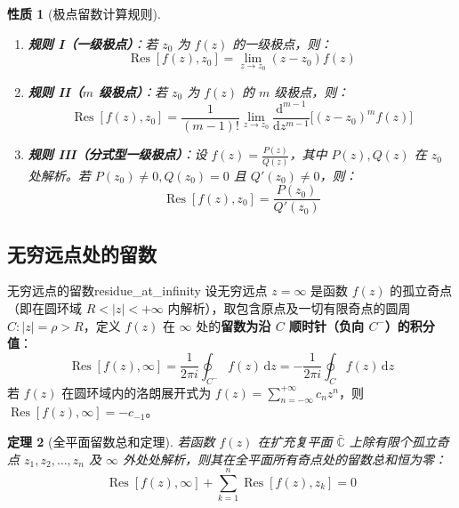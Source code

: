 \documentclass[11pt,a4paper,fontset=fandol]{ctexart}
\newtheorem{theorem}{定理}[section]
\newtheorem{property}[theorem]{性质}
\theoremstyle{remark}
\begin{document}
\begin{property}[极点留数计算规则]
\begin{enumerate}
    \item \textbf{规则 I（一级极点）}：若 $z_0$ 为 $f(z)$ 的一级极点，则：
    \begin{equation}
        \operatorname{Res}[f(z), z_0] = \lim_{z \to z_0} (z - z_0) f(z)
    \end{equation}
    \item \textbf{规则 II（$m$ 级极点）}：若 $z_0$ 为 $f(z)$ 的 $m$ 级极点，则：
    \begin{equation}
        \operatorname{Res}[f(z), z_0] = \frac{1}{(m - 1)!} \lim_{z \to z_0} \frac{\mathrm{d}^{m-1}}{\mathrm{d}z^{m-1}} \Big[ (z - z_0)^m f(z) \Big]
    \end{equation}
    \item \textbf{规则 III（分式型一级极点）}：设 $f(z) = \frac{P(z)}{Q(z)}$，其中 $P(z), Q(z)$ 在 $z_0$ 处解析。若 $P(z_0) \neq 0, Q(z_0) = 0$ 且 $Q'(z_0) \neq 0$，则：
    \begin{equation}
        \operatorname{Res}[f(z), z_0] = \frac{P(z_0)}{Q'(z_0)}
    \end{equation}
\end{enumerate}
\end{property}

\subsection{无穷远点处的留数}

\begin{definition}{无穷远点的留数}{residue_at_infinity}
设无穷远点 $z = \infty$ 是函数 $f(z)$ 的孤立奇点（即在圆环域 $R < |z| < +\infty$ 内解析），取包含原点及一切有限奇点的圆周 $C: |z| = \rho > R$，定义 $f(z)$ 在 $\infty$ 处的\textbf{留数为沿 $C$ 顺时针（负向 $C^-$）的积分值}：
\begin{equation}
    \operatorname{Res}[f(z), \infty] = \frac{1}{2\pi i} \oint_{C^-} f(z)\,\mathrm{d}z = -\frac{1}{2\pi i} \oint_C f(z)\,\mathrm{d}z
\end{equation}
若 $f(z)$ 在圆环域内的洛朗展开式为 $f(z) = \sum_{n=-\infty}^{+\infty} c_n z^n$，则 $\operatorname{Res}[f(z), \infty] = -c_{-1}$。
\end{definition}

\begin{theorem}[全平面留数总和定理]
若函数 $f(z)$ 在扩充复平面 $\bar{\mathbb{C}}$ 上除有限个孤立奇点 $z_1, z_2, \dots, z_n$ 及 $\infty$ 外处处解析，则其在全平面所有奇点处的留数总和恒为零：
\begin{equation}
    \operatorname{Res}[f(z), \infty] + \sum_{k=1}^n \operatorname{Res}[f(z), z_k] = 0
\end{equation}
\end{theorem}
\end{document}
